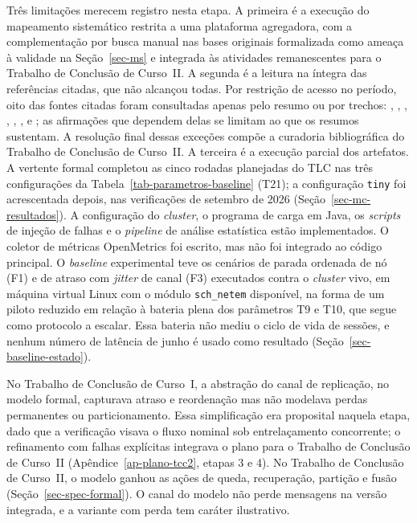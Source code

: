 Três limitações merecem registro nesta etapa. A primeira é a execução do mapeamento sistemático restrita a uma plataforma agregadora, com a complementação por busca manual nas bases originais formalizada como ameaça à validade na Seção~\ref{sec-ms} e integrada às atividades remanescentes para o Trabalho de Conclusão de Curso~II.
A segunda é a leitura na íntegra das referências citadas, que não alcançou todas. Por restrição de acesso no período, oito das fontes citadas foram consultadas apenas pelo resumo ou por trechos: \citet{newcombe_aws_tla_2014}, \citet{liu_quantitative_consistency_2015}, \citet{naskos_probabilistic_mc_2017}, \citet{wu_anna_autoscale_2020}, \citet{gambi_assurance_selfadaptive_2013}, \citet{rosa_selfmgmt_2013}, \citet{enea_must_2024} e \citet{benmokhtar_scheduling_2024}; as afirmações que dependem delas se limitam ao que os resumos sustentam. A resolução final dessas exceções compõe a curadoria bibliográfica do Trabalho de Conclusão de Curso~II. A terceira é a execução parcial dos artefatos. A vertente formal completou as cinco rodadas planejadas do TLC nas três configurações da Tabela~\ref{tab-parametros-baseline} (T21); a configuração \texttt{tiny} foi acrescentada depois, nas verificações de setembro de 2026 (Seção~\ref{sec-mc-resultados}). A configuração do \emph{cluster}, o programa de carga em Java, os \emph{scripts} de injeção de falhas e o \emph{pipeline} de análise estatística estão implementados. O coletor de métricas OpenMetrics \citep{openmetrics_spec} foi escrito, mas não foi integrado ao código principal. O \emph{baseline} experimental teve os cenários de parada ordenada de nó (F1) e de atraso com \emph{jitter} de canal (F3) executados contra o \emph{cluster} vivo, em máquina virtual Linux com o módulo \texttt{sch\_netem} disponível, na forma de um piloto reduzido em relação à bateria plena dos parâmetros T9 e T10, que segue como protocolo a escalar. Essa bateria não mediu o ciclo de vida de sessões, e nenhum número de latência de junho é usado como resultado (Seção~\ref{sec-baseline-estado}).

No Trabalho de Conclusão de Curso~I, a abstração do canal de replicação, no modelo formal, capturava atraso e reordenação mas não modelava perdas permanentes ou particionamento. Essa simplificação era proposital naquela etapa, dado que a verificação visava o fluxo nominal sob entrelaçamento concorrente; o refinamento com falhas explícitas integrava o plano para o Trabalho de Conclusão de Curso~II (Apêndice~\ref{ap-plano-tcc2}, etapas 3 e 4). No Trabalho de Conclusão de Curso~II, o modelo ganhou as ações de queda, recuperação, partição e fusão (Seção~\ref{sec-spec-formal}). O canal do modelo não perde mensagens na versão integrada, e a variante com perda tem caráter ilustrativo.

